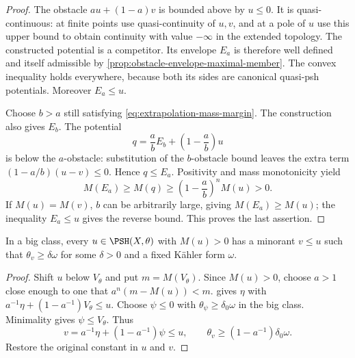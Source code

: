 \begin{proof}
The obstacle $a u+(1-a)v$ is bounded above by $u\leq0$. It is quasi-continuous: at finite points use quasi-continuity of $u,v$, and at a pole of $u$ use this upper bound to obtain continuity with value $-\infty$ in the extended topology. The constructed potential is a competitor. Its envelope $E_a$ is therefore well defined and itself admissible by \cref{prop:obstacle-envelope-maximal-member}. The convex inequality holds everywhere, because both its sides are canonical quasi-psh potentials. Moreover $E_a\leq u$.

Choose $b>a$ still satisfying \eqref{eq:extrapolation-mass-margin}. The construction also gives $E_b$. The potential
\[
 q=\frac ab E_b+\left(1-\frac ab\right)u
\]
is below the $a$-obstacle: substitution of the $b$-obstacle bound leaves the extra term $(1-a/b)(u-v)\leq0$. Hence $q\leq E_a$. Positivity and mass monotonicity yield
\[
 M(E_a)\geq M(q)\geq\left(1-\frac ab\right)^nM(u)>0.
\]
If $M(u)=M(v)$, $b$ can be arbitrarily large, giving $M(E_a)\geq M(u)$; the inequality $E_a\leq u$ gives the reverse bound. This proves the last assertion.
\end{proof}

\begin{lemma}\label{lem:positive-mass-strict-minorant}
In a big class, every $u\in\PSH(X,\theta)$ with $M(u)>0$ has a minorant $v\leq u$ such that $\theta_v\geq\delta\omega$ for some $\delta>0$ and a fixed K\"ahler form $\omega$.
\end{lemma}
\begin{proof}
Shift $u$ below $V_\theta$ and put $m=M(V_\theta)$. Since $M(u)>0$, choose $a>1$ close enough to one that $a^n(m-M(u))<m$.  gives $\eta$ with
$a^{-1}\eta+(1-a^{-1})V_\theta\leq u$. Choose $\psi\leq0$ with $\theta_\psi\geq\delta_0\omega$ in the big class. Minimality gives $\psi\leq V_\theta$. Thus
\[
 v=a^{-1}\eta+(1-a^{-1})\psi\leq u,\qquad
 \theta_v\geq(1-a^{-1})\delta_0\omega.
\]
Restore the original constant in $u$ and $v$.
\end{proof}

